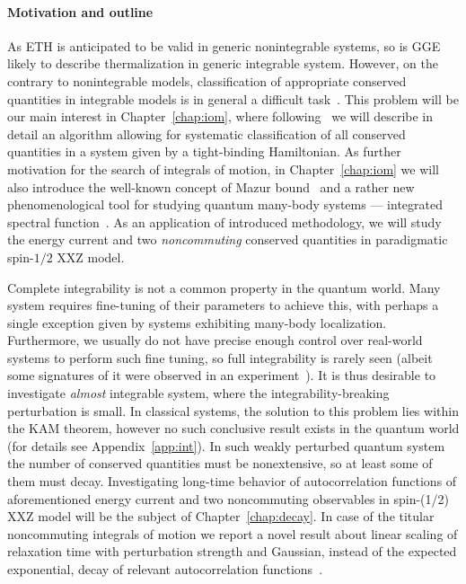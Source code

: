 \paragraph{Motivation and outline}As ETH is anticipated to be valid in generic
nonintegrable systems, so is GGE likely to describe thermalization in generic integrable system.
However, on the contrary to nonintegrable models, classification of appropriate 
conserved quantities in integrable models is in general a difficult task~\autocite{DAlessio2016}.
This problem will be our main interest in Chapter~\ref{chap:iom}, where 
following~\textcite{Mierzejewski2015a} we will describe in detail an algorithm allowing for
systematic classification of all conserved quantities in a system given by a tight-binding
Hamiltonian. As further motivation for the search of integrals of motion, in
Chapter~\ref{chap:iom} we will also introduce the well-known concept of Mazur 
bound~\autocite{Mazur1969,Suzuki1971} and a rather new phenomenological tool for studying
quantum many-body systems --- integrated spectral function~\autocite{Vidmar2021}. 
As an application of introduced methodology, we will study the energy current and
two \textit{noncommuting} conserved quantities in paradigmatic spin-\(1/2\) XXZ model.


Complete integrability is not a common property in the quantum world.
Many system requires fine-tuning of their parameters to achieve this, with perhaps a single
exception given by systems exhibiting many-body localization. Furthermore, we usually
do not have precise enough control over real-world systems to perform such fine tuning,
so full integrability is rarely seen (albeit some signatures of it were 
observed in an experiment~\autocite{Khemani2019}). It is thus desirable to investigate
\emph{almost} integrable system, where the integrability-breaking perturbation is small.
In classical systems, the solution to this problem lies within the KAM theorem, however
no such conclusive result exists in the quantum world (for details see Appendix~\ref{app:int}).
In such weakly perturbed quantum system the number of conserved quantities must be nonextensive,
so at least some of them must decay. Investigating long-time behavior of autocorrelation functions of
aforementioned energy current and two noncommuting observables 
in spin-(1/2) XXZ model will be the subject of Chapter~\ref{chap:decay}. In case of
the titular noncommuting integrals of motion we report a novel
result about linear scaling of relaxation time with perturbation strength and Gaussian,
instead of the expected exponential, decay of relevant autocorrelation functions~\autocite{mierzejewski2021multiple}.
 
